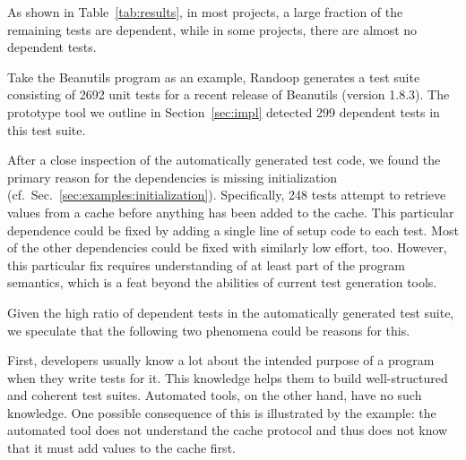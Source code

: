 \newcommand{\pub}{\texttt{Prop\-er\-ty\-Utils\-Bean}}
\newcommand{\fhm}{\texttt{Fast\-Hash\-Map}}
\newcommand{\cub}{\texttt{ConvertUtilsBean}}

As shown in Table~\ref{tab:results}, in most
projects, a large fraction of the remaining tests are dependent, while
in some projects, there are almost no dependent tests.

Take the Beanutils program as an example, Randoop generates a test suite consisting of
2692 unit tests for a recent release of Beanutils (version 1.8.3).
The prototype tool we outline in Section~\ref{sec:impl}
detected 299 dependent tests in this test
suite.

After a close inspection of the automatically generated test code, we found
the primary reason for the dependencies is missing initialization 
(cf.~Sec.~\ref{sec:examples:initialization}).
Specifically, 248 tests attempt to retrieve values from a cache before
anything has been added to the cache. This particular dependence could be
fixed by adding a single line of setup code to each test.
Most of the other dependencies could be fixed with similarly low effort, too.
However, this particular fix requires understanding of at least part
of the program semantics, which is a feat beyond the abilities of
current test generation tools.



Given the high ratio of dependent tests in the automatically generated
test suite, we speculate that the following two phenomena could be
reasons for this.

First, developers usually know a lot about the intended purpose of a
program when they write tests for it. This knowledge helps them to
build well-structured and coherent test suites.
Automated tools, on the other hand, have no such knowledge. One
possible consequence of this is illustrated by the example: the
automated tool does not understand the cache protocol and thus does
not know that it must add values to the cache first. 

